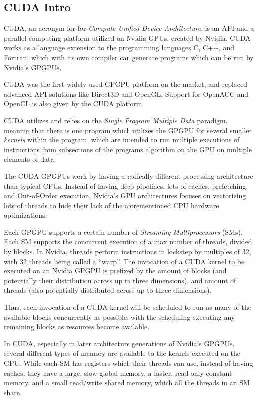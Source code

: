 \subsection{CUDA Intro}

CUDA, an acronym for for \textit{Compute Unified Device Architecture}, is an API and a parallel computing platform utilized on Nvidia GPUs, created by Nvidia.
CUDA works as a language extension to the programming languages C, C++, and Fortran, which with its own compiler can generate programs which can be run by Nvidia's GPGPUs.

CUDA was the first widely used GPGPU platform on the market, and replaced advanced API solutions like Direct3D and OpenGL.
Support for OpenACC and OpenCL is also given by the CUDA platform.

CUDA utilizes and relies on the \textit{Single Program Multiple Data} paradigm, meaning that there is one program which utilizes the GPGPU for several smaller \textit{kernels} within the program, which are intended to run multiple executions of instructions from subsections of the programs algorithm on the GPU on multiple elements of data.

The CUDA GPGPUs work by having a radically different processing architecture than typical CPUs.
Instead of having deep pipelines, lots of caches, prefetching, and Out-of-Order execution, Nvidia's GPU architectures focuses on vectorizing lots of threads to hide their lack of the aforementioned CPU hardware optimizations.

Each GPGPU supports a certain number of \textit{Streaming Multiprocessors} (SMs).
Each SM supports the concurrent execution of a max number of threads, divided by blocks. In Nvidia, threads perform instructions in lockstep by multiples of 32, with 32 threads being called a ``warp''.
The invocation of a CUDA kernel to be executed on an Nvidia GPGPU is prefixed by the amount of blocks (and potentially their distribution across up to three dimensions), and amount of threads (also potentially distributed across up to three dimensions).

Thus, each invocation of a CUDA kernel will be scheduled to run as many of the available blocks concurrently as possible, with the scheduling executing any remaining blocks as resources become available.

In CUDA, especially in later architecture generations of Nvidia's GPGPUs, several different types of memory are available to the kernels executed on the GPU.
While each SM has registers which their threads can use, instead of having caches, they have a large, slow global memory, a faster, read-only constant memory, and a small read/write shared memory, which all the threads in an SM share.

